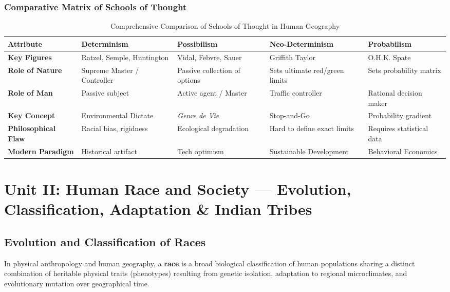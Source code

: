 \documentclass[11pt,a4paper]{article}
\begin{document}
\subsubsection{Comparative Matrix of Schools of Thought}
\begin{table}[h!]
\centering
\small
\begin{tabularx}{\textwidth}{l X X X X}
\toprule
\textbf{Attribute} & \textbf{Determinism} & \textbf{Possibilism} & \textbf{Neo-Determinism} & \textbf{Probabilism} \\
\midrule
\textbf{Key Figures} & Ratzel, Semple, Huntington & Vidal, Febvre, Sauer & Griffith Taylor & O.H.K. Spate \\
\textbf{Role of Nature} & Supreme Master / Controller & Passive collection of options & Sets ultimate red/green limits & Sets probability matrix \\
\textbf{Role of Man} & Passive subject & Active agent / Master & Traffic controller & Rational decision maker \\
\textbf{Key Concept} & Environmental Dictate & \textit{Genre de Vie} & Stop-and-Go & Probability gradient \\
\textbf{Philosophical Flaw} & Racial bias, rigidness & Ecological degradation & Hard to define exact limits & Requires statistical data \\
\textbf{Modern Paradigm} & Historical artifact & Tech optimism & Sustainable Development & Behavioral Economics \\
\bottomrule
\end{tabularx}
\caption{Comprehensive Comparison of Schools of Thought in Human Geography}
\end{table}

\newpage
\section{Unit II: Human Race and Society --- Evolution, Classification, Adaptation \& Indian Tribes}

\subsection{Evolution and Classification of Races}

\begin{defbox}
In physical anthropology and human geography, a \textbf{race} is a broad biological classification of human populations sharing a distinct combination of heritable physical traits (phenotypes) resulting from genetic isolation, adaptation to regional microclimates, and evolutionary mutation over geographical time.
\end{defbox}
\end{document}
